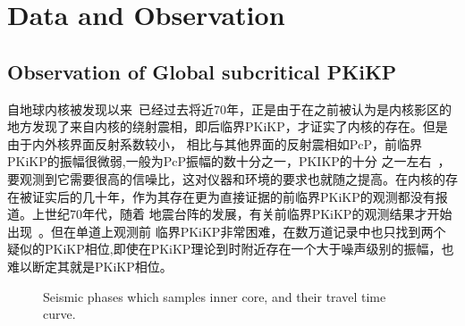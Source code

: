 \chapter{Data and Observation}


\section{Observation of Global subcritical PKiKP}

自地球内核被发现以来~\citep{lehmann1936p}已经过去将近70年，正是由于在之前被认为是内核影区的
地方发现了来自内核的绕射震相，即后临界PKiKP，才证实了内核的存在。但是由于内外核界面反射系数较小，
相比与其他界面的反射震相如PcP，前临界PKiKP的振幅很微弱,一般为PcP振幅的数十分之一，PKIKP的十分
之一左右~\citep{Bolt1965}，要观测到它需要很高的信噪比，这对仪器和环境的要求也就随之提高。在内核的存在被证实后的几十年，作为其存在更为直接证据的前临界PKiKP的观测都没有报道。上世纪70年代，随着
地震台阵的发展，有关前临界PKiKP的观测结果才开始出现~\citep{Engdahl1970a}。但在单道上观测前
临界PKiKP非常困难，\citep{Shearer1990}在数万道记录中也只找到两个疑似的PKiKP相位,即使在PKiKP理论到时附近存在一个大于噪声级别的振幅，也难以断定其就是PKiKP相位。

\begin{figure}[!ht]
	\hfill{}
	\hfill{}
	\hfill{}
	\caption{Seismic phases which samples inner core, and their travel time %
curve.}
\end{figure}

